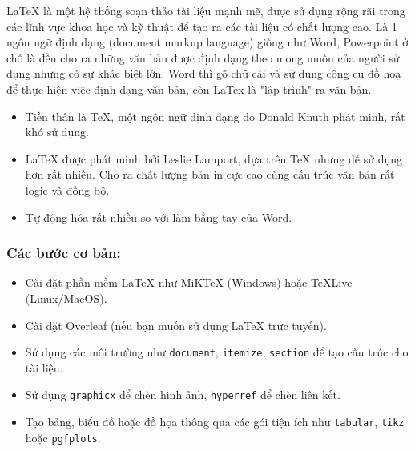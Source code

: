 LaTeX là một hệ thống soạn thảo tài liệu mạnh mẽ, được sử dụng rộng rãi trong các lĩnh vực khoa học và kỹ thuật để tạo ra các tài liệu có chất lượng cao. Là 1 ngôn ngữ định dạng (document markup language) giống như Word, Powerpoint ở chỗ là đều cho ra những văn bản được định dạng theo mong muốn của người sử dụng nhưng có sự khác biệt lớn. Word thì gõ chữ cái và sử dụng công cụ đồ hoạ để thực hiện việc định dạng văn bản, còn LaTex là "lập trình" ra văn bản.
\begin{itemize}
 \item Tiền thân là TeX, một ngôn ngữ định dạng do Donald Knuth phát minh, rất khó sử dụng.
 \item LaTeX được phát minh bởi Leslie Lamport, dựa trên TeX nhưng dễ sử dụng hơn rất nhiều. Cho ra chất lượng bản in cực cao cùng cấu trúc văn bản rất logic và đồng bộ.
 \item Tự động hóa rất nhiều so với làm bằng tay của Word.
\end{itemize}

\subsubsection{Các bước cơ bản:}
\begin{itemize}
    \item Cài đặt phần mềm LaTeX như MiKTeX (Windows) hoặc TeXLive (Linux/MacOS).
    \item Cài đặt Overleaf (nếu bạn muốn sử dụng LaTeX trực tuyến).
    \item Sử dụng các môi trường như \texttt{document}, \texttt{itemize}, \texttt{section} để tạo cấu trúc cho tài liệu.
    \item Sử dụng \texttt{graphicx} để chèn hình ảnh, \texttt{hyperref} để chèn liên kết.
    \item Tạo bảng, biểu đồ hoặc đồ họa thông qua các gói tiện ích như \texttt{tabular}, \texttt{tikz} hoặc \texttt{pgfplots}.
\end{itemize}

